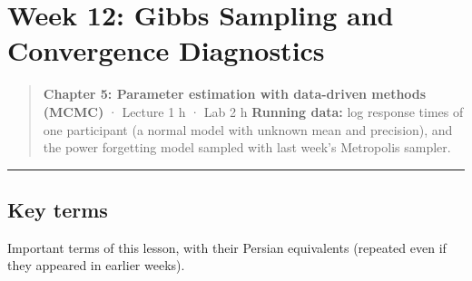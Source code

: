 \section{Week 12: Gibbs Sampling and Convergence Diagnostics}

\begin{quote}
\textbf{Chapter 5: Parameter estimation with data-driven methods (MCMC)}
· Lecture 1 h · Lab 2 h \textbf{Running data:} log response times of one
participant (a normal model with unknown mean and precision), and the
power forgetting model sampled with last week's Metropolis sampler.
\end{quote}

\begin{center}\rule{0.5\linewidth}{0.5pt}\end{center}

\subsection{Key terms}

Important terms of this lesson, with their Persian equivalents (repeated
even if they appeared in earlier weeks).

